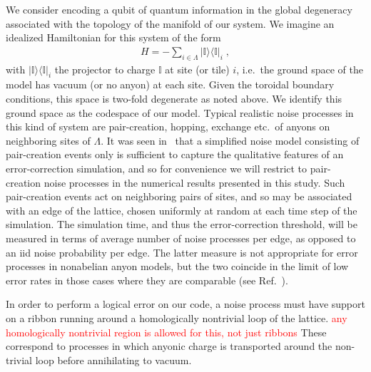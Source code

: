 \documentclass[aps, prl, letterpaper, twocolumn, superscriptaddress, notitlepage, 10pt]{revtex4-1}
\newcommand{\vac}{\mathbb{I}}
\newcommand{\ket}[1]{|{#1}\rangle}
\newcommand{\bra}[1]{\langle{#1}|}
\newcommand{\ketbra}[2]{\ket{#1}\!\bra{#2}}
\newcommand{\proj}[1]{\ketbra{#1}{#1}}
\newcommand{\dude}[1]{\textcolor{red}{#1}}
\begin{document}
We consider encoding a qubit of quantum information in the global degeneracy associated 
with the topology of the manifold of our system. We imagine an idealized Hamiltonian for this 
system of the form
\begin{align}
	H=-\sum_{i\in \Lambda}\proj{\vac}_i\;,\label{e:hamiltonian}
\end{align}
with $\proj{\vac}_i$ the projector to charge $\vac$ at site (or tile) $i$, i.e.~the ground 
space of the model has vacuum (or no anyon) at each site. Given the toroidal boundary 
conditions, this space is two-fold degenerate as noted above. We identify this ground space 
as the codespace of our model. Typical realistic noise processes in this kind of system are 
pair-creation, hopping, exchange etc.~of anyons on neighboring sites of $\Lambda$. It was 
seen in~\cite{Brell2013} that a simplified noise model consisting of pair-creation events only 
is sufficient to capture the qualitative features of an error-correction simulation, and so for convenience we 
will restrict to pair-creation noise processes in the numerical results presented in this study. 
Such pair-creation events act on neighboring pairs of sites,
and so may be associated with an edge of the lattice, chosen 
uniformly at random at each time step of the simulation. The simulation time, and thus the 
error-correction threshold, will be measured in terms of average number of noise processes 
per edge, as opposed to an iid noise probability per edge. The latter measure is not 
appropriate for error processes in nonabelian anyon models, but the two coincide in the limit 
of low error rates in those cases where they are comparable (see Ref.~\cite{Brell2013}).

In order to perform a logical error on our code, a noise process must have support on a 
ribbon running around a homologically nontrivial loop of the lattice.
\dude{any homologically nontrivial region is allowed for this, not just ribbons}
These correspond to 
processes in which anyonic charge is transported around the non-trivial loop before 
annihilating to vacuum.
\end{document}
